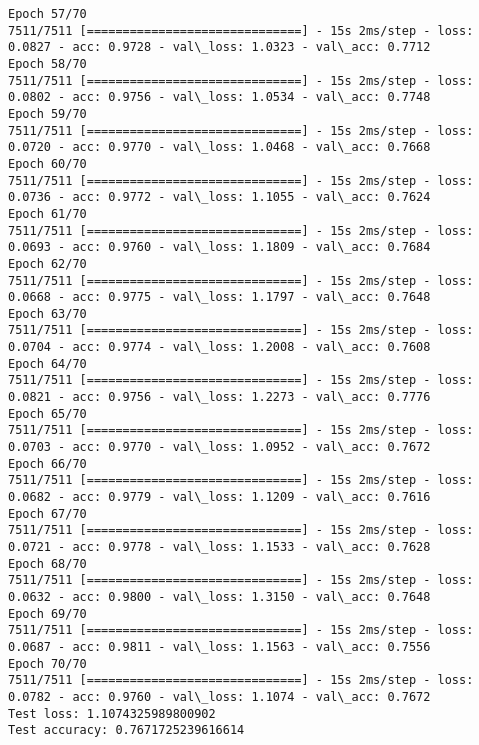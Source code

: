 \documentclass[11pt]{article}
\begin{document}
\begin{Verbatim}[commandchars=\\\{\}]
Epoch 57/70
7511/7511 [==============================] - 15s 2ms/step - loss: 0.0827 - acc: 0.9728 - val\_loss: 1.0323 - val\_acc: 0.7712
Epoch 58/70
7511/7511 [==============================] - 15s 2ms/step - loss: 0.0802 - acc: 0.9756 - val\_loss: 1.0534 - val\_acc: 0.7748
Epoch 59/70
7511/7511 [==============================] - 15s 2ms/step - loss: 0.0720 - acc: 0.9770 - val\_loss: 1.0468 - val\_acc: 0.7668
Epoch 60/70
7511/7511 [==============================] - 15s 2ms/step - loss: 0.0736 - acc: 0.9772 - val\_loss: 1.1055 - val\_acc: 0.7624
Epoch 61/70
7511/7511 [==============================] - 15s 2ms/step - loss: 0.0693 - acc: 0.9760 - val\_loss: 1.1809 - val\_acc: 0.7684
Epoch 62/70
7511/7511 [==============================] - 15s 2ms/step - loss: 0.0668 - acc: 0.9775 - val\_loss: 1.1797 - val\_acc: 0.7648
Epoch 63/70
7511/7511 [==============================] - 15s 2ms/step - loss: 0.0704 - acc: 0.9774 - val\_loss: 1.2008 - val\_acc: 0.7608
Epoch 64/70
7511/7511 [==============================] - 15s 2ms/step - loss: 0.0821 - acc: 0.9756 - val\_loss: 1.2273 - val\_acc: 0.7776
Epoch 65/70
7511/7511 [==============================] - 15s 2ms/step - loss: 0.0703 - acc: 0.9770 - val\_loss: 1.0952 - val\_acc: 0.7672
Epoch 66/70
7511/7511 [==============================] - 15s 2ms/step - loss: 0.0682 - acc: 0.9779 - val\_loss: 1.1209 - val\_acc: 0.7616
Epoch 67/70
7511/7511 [==============================] - 15s 2ms/step - loss: 0.0721 - acc: 0.9778 - val\_loss: 1.1533 - val\_acc: 0.7628
Epoch 68/70
7511/7511 [==============================] - 15s 2ms/step - loss: 0.0632 - acc: 0.9800 - val\_loss: 1.3150 - val\_acc: 0.7648
Epoch 69/70
7511/7511 [==============================] - 15s 2ms/step - loss: 0.0687 - acc: 0.9811 - val\_loss: 1.1563 - val\_acc: 0.7556
Epoch 70/70
7511/7511 [==============================] - 15s 2ms/step - loss: 0.0782 - acc: 0.9760 - val\_loss: 1.1074 - val\_acc: 0.7672
Test loss: 1.1074325989800902
Test accuracy: 0.7671725239616614

    \end{Verbatim}
\end{document}
